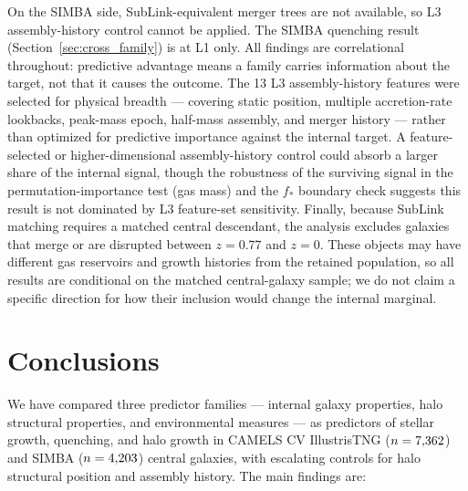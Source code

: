 \documentclass[twocolumn,linenumbers]{aastex701}
\newcommand{\fstar}{f_*}
\begin{document}
On the SIMBA side, SubLink-equivalent merger trees are not available, so L3
assembly-history control cannot be applied. The SIMBA quenching result
(Section~\ref{sec:cross_family}) is at L1 only.
All findings are correlational throughout: predictive advantage means a
family carries information about the target, not that it causes the outcome.
The 13 L3 assembly-history features were selected for physical breadth ---
covering static position, multiple accretion-rate lookbacks, peak-mass epoch,
half-mass assembly, and merger history --- rather than optimized for
predictive importance against the internal target.
A feature-selected or higher-dimensional assembly-history control could absorb
a larger share of the internal signal, though the robustness of the surviving
signal in the permutation-importance test (gas mass) and the $\fstar$ boundary
check suggests this result is not dominated by L3 feature-set
sensitivity.
Finally, because SubLink matching requires a matched central descendant, the
analysis excludes galaxies that merge or are disrupted between $z = 0.77$ and
$z = 0$. These objects may have different gas reservoirs and growth histories from
the retained population, so all results are conditional on the matched
central-galaxy sample; we do not claim a specific direction for how their inclusion
would change the internal marginal.

\section{\textbf{Conclusions}}
\label{sec:conclusions}

We have compared three predictor families --- internal galaxy properties,
halo structural properties, and environmental measures --- as predictors of
stellar growth, quenching, and halo growth in CAMELS CV IllustrisTNG
($n = 7{,}362$) and SIMBA ($n = 4{,}203$) central galaxies,
with escalating controls for halo structural position and assembly history.
The main findings are:
\end{document}
